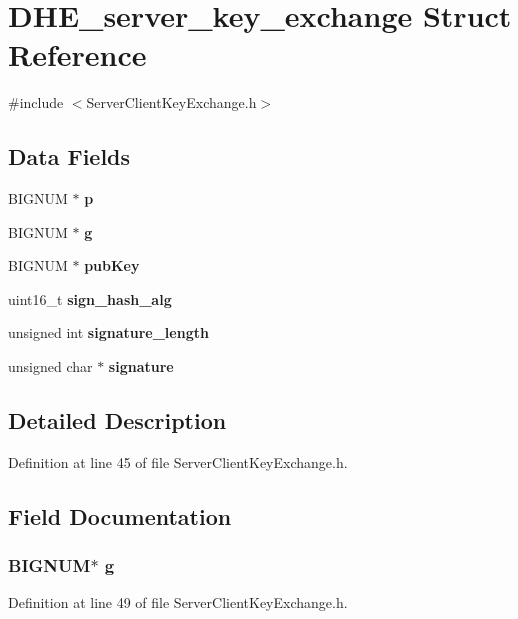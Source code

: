 \section{D\+H\+E\+\_\+server\+\_\+key\+\_\+exchange Struct Reference}
\label{struct_d_h_e__server__key__exchange}


{\ttfamily \#include $<$Server\+Client\+Key\+Exchange.\+h$>$}

\subsection*{Data Fields}
\begin{DoxyCompactItemize}
\item 
B\+I\+G\+N\+UM $\ast$ {\bf p}
\item 
B\+I\+G\+N\+UM $\ast$ {\bf g}
\item 
B\+I\+G\+N\+UM $\ast$ {\bf pub\+Key}
\item 
uint16\+\_\+t {\bf sign\+\_\+hash\+\_\+alg}
\item 
unsigned int {\bf signature\+\_\+length}
\item 
unsigned char $\ast$ {\bf signature}
\end{DoxyCompactItemize}


\subsection{Detailed Description}


Definition at line 45 of file Server\+Client\+Key\+Exchange.\+h.



\subsection{Field Documentation}
\subsubsection[{g}]{\setlength{\rightskip}{0pt plus 5cm}B\+I\+G\+N\+UM$\ast$ g}\label{struct_d_h_e__server__key__exchange_ada27d9fb07daaac14be19b4ce12a7400}


Definition at line 49 of file Server\+Client\+Key\+Exchange.\+h.

